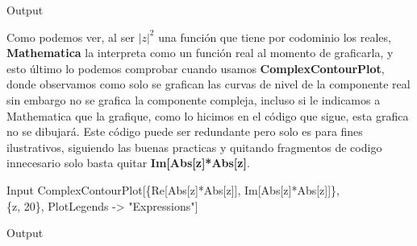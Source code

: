 \begin{mmaCell}[moregraphics={moreig={scale=.4}}]{Output}
\end{mmaCell}
Como podemos ver, al ser $|z|^2$ una función que tiene por codominio los reales, \textbf{Mathematica} la interpreta como un función real al momento de graficarla, y esto último lo podemos comprobar cuando usamos \textbf{ComplexContourPlot}, donde observamos como solo se grafican las curvas de nivel de la componente real sin embargo no se grafica la componente compleja, incluso si le indicamos a Mathematica que la grafique, como lo hicimos en el código que sigue, esta grafica no se dibujará. Este código puede ser redundante pero solo es para fines ilustrativos, siguiendo las buenas practicas y quitando fragmentos de codigo innecesario solo basta quitar \textbf{Im[Abs[z]*Abs[z]}.
\begin{mmaCell}{Input}
	 ComplexContourPlot[\{Re[Abs[z]*Abs[z]], Im[Abs[z]*Abs[z]]\},\\\{z, 20\}, PlotLegends -> "Expressions"]
\end{mmaCell}

\begin{mmaCell}[moregraphics={moreig={scale=.35}}]{Output}
\end{mmaCell}



